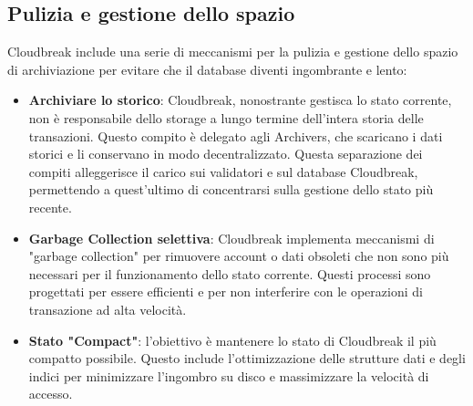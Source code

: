 \documentclass[a4paper,12pt]{report}
\begin{document}
	\subsection{Pulizia e gestione dello spazio}
	Cloudbreak include una serie di meccanismi per la pulizia e gestione dello spazio di archiviazione per evitare che il database diventi ingombrante e lento:
	\begin{itemize}
		\item \textbf{Archiviare lo storico}: Cloudbreak, nonostrante gestisca lo stato corrente, non è responsabile dello storage a lungo termine dell'intera storia delle transazioni. Questo compito è delegato agli Archivers, che scaricano i dati storici e li conservano in modo decentralizzato. Questa separazione dei compiti alleggerisce il carico sui validatori e sul database Cloudbreak, permettendo a quest'ultimo di concentrarsi sulla gestione dello stato più recente.
		\item \textbf{Garbage Collection selettiva}: Cloudbreak implementa meccanismi di "garbage collection" per rimuovere account o dati obsoleti che non sono più necessari per il funzionamento dello stato corrente. Questi processi sono progettati per essere efficienti e per non interferire con le operazioni di transazione ad alta velocità.
		\item \textbf{Stato "Compact"}: l'obiettivo è mantenere lo stato di Cloudbreak il più compatto possibile. Questo include l'ottimizzazione delle strutture dati e degli indici per minimizzare l'ingombro su disco e massimizzare la velocità di accesso.
	\end{itemize}
	
\end{document}
